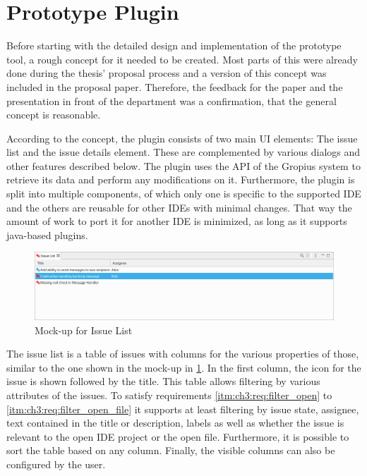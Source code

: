 \section{Prototype Plugin}
\label{sec:ch3:s3}
Before starting with the detailed design and implementation of the prototype tool, a rough concept for it needed to be created.
Most parts of this were already done during the thesis' proposal process and a version of this concept was included in the proposal paper.
Therefore, the feedback for the paper and the presentation in front of the department was a confirmation, that the general concept is reasonable.

According to the concept, the plugin consists of two main \gls{UI} elements: The issue list and the issue details element.
These are complemented by various dialogs and other features described below.
The plugin uses the \gls{API} of the Gropius system \cite{speth2020gropius} to retrieve its data and perform any modifications on it.
Furthermore, the plugin is split into multiple components, 
of which only one is specific to the supported \gls{IDE} 
and the others are reusable for other \glspl{IDE} with minimal changes.
That way the amount of work to port it for another \gls{IDE} is minimized,
as long as it supports java-based plugins.

\begin{figure}[!h]
	\centering
	\includegraphics[width=\textwidth]{graphics/concept_mockup_issueList.png}
	\caption{Mock-up for Issue List}
	\label{fig:c3:mockup_issueList}
\end{figure}
The issue list is a table of issues with columns for the various properties of those, 
similar to the one shown in the mock-up in \cref{fig:c3:mockup_issueList}.
In the first column, the icon for the issue is shown followed by the title.
This table allows filtering by various attributes of the issues.
To satisfy requirements \ref{itm:ch3:req:filter_open} to \ref{itm:ch3:req:filter_open_file} it supports at least filtering
by issue state, assignee, text contained in the title or description, 
labels as well as whether the issue is relevant to the open \gls{IDE} project or the open file.
Furthermore, it is possible to sort the table based on any column. 
Finally, the visible columns can also be configured by the user.

